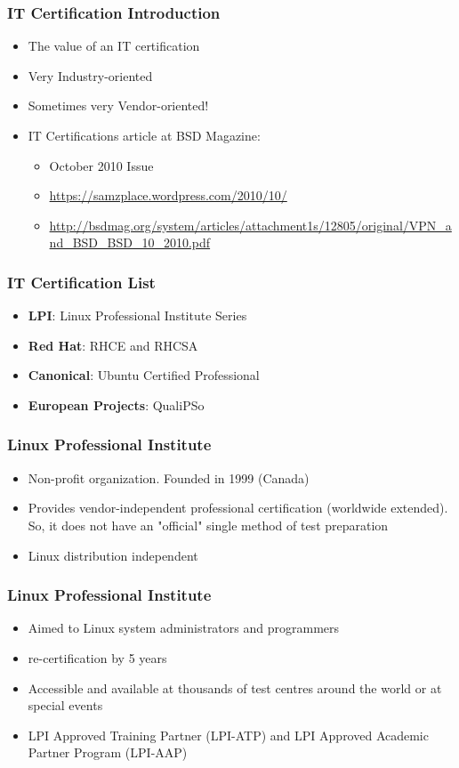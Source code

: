 \documentclass{beamer}
\begin{document}
\begin{frame}
\frametitle{IT Certification Introduction}
\begin{itemize}
\item The value of an IT certification
\item Very Industry-oriented
\item Sometimes very Vendor-oriented!
\item IT Certifications article at BSD Magazine:
\begin{itemize}
\item October 2010 Issue
\item \url{https://samzplace.wordpress.com/2010/10/}
\item \url{http://bsdmag.org/system/articles/attachment1s/12805/original/VPN_and_BSD_BSD_10_2010.pdf}
\end{itemize}
\end{itemize}
\end{frame}




\begin{frame}
\frametitle{IT Certification List}
\begin{itemize}
\item {\bf LPI}: Linux Professional Institute Series
\item {\bf Red Hat}: RHCE and RHCSA
\item {\bf Canonical}: Ubuntu Certified Professional
\item {\bf European Projects}: QualiPSo
\end{itemize}
\end{frame}




\begin{frame}
\frametitle{Linux Professional Institute}
\begin{itemize}
\item Non-profit organization. Founded in 1999 (Canada)
\item Provides vendor-independent professional certification (worldwide extended). So, it does not have an "official" single method of test preparation
\item Linux distribution independent 
\end{itemize}
\end{frame}


\begin{frame}
\frametitle{Linux Professional Institute}
\begin{itemize}
\item Aimed to Linux system administrators and programmers
\item re-certification by 5 years
\item Accessible and available at thousands of test centres around the world or at special events
\item LPI Approved Training Partner (LPI-ATP) and LPI Approved Academic Partner Program (LPI-AAP)
\end{itemize}
\end{frame}
\end{document}

